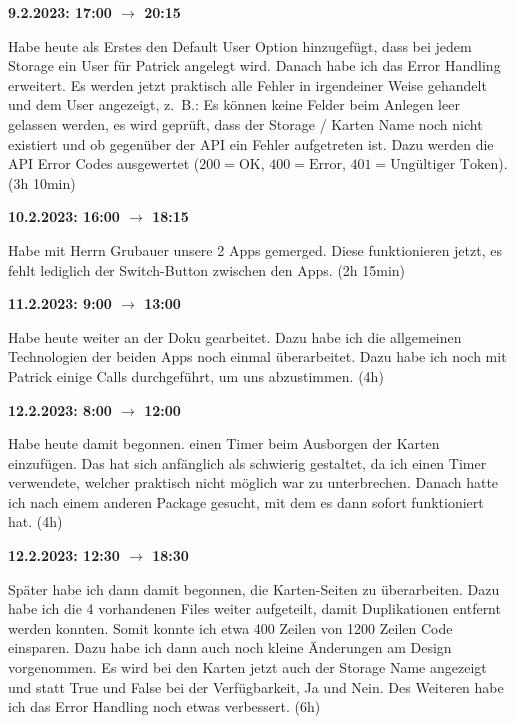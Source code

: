 \vspace{0.5cm}

\textbf{9.2.2023: 17:00 $\rightarrow$ 20:15}

Habe heute als Erstes den Default User Option hinzugefügt, dass bei jedem Storage ein User für Patrick angelegt wird. Danach habe ich das Error Handling erweitert. Es werden jetzt praktisch alle Fehler in irgendeiner Weise gehandelt und dem User angezeigt, z. B.: Es können keine Felder beim Anlegen leer gelassen werden, es wird geprüft, dass der Storage / Karten Name noch nicht existiert und ob gegenüber der API ein Fehler aufgetreten ist. Dazu werden die API Error Codes ausgewertet ($200 = \text{OK}$, $400 = \text{Error}$, $401 = \text{Ungültiger Token}$). (3h 10min)

\vspace{0.5cm}

\textbf{10.2.2023: 16:00 $\rightarrow$ 18:15}

Habe mit Herrn Grubauer unsere 2 Apps gemerged. Diese funktionieren jetzt, es fehlt lediglich der Switch-Button zwischen den Apps. (2h 15min)

\vspace{0.5cm}

\textbf{11.2.2023: 9:00 $\rightarrow$ 13:00} \

Habe heute weiter an der Doku gearbeitet. Dazu habe ich die allgemeinen Technologien der beiden Apps noch einmal überarbeitet. Dazu habe ich noch mit Patrick einige Calls durchgeführt, um uns abzustimmen. (4h)

\vspace{0.5cm}

\textbf{12.2.2023: 8:00 $\rightarrow$ 12:00} \

Habe heute damit begonnen. einen Timer beim Ausborgen der Karten einzufügen. Das hat sich anfänglich als schwierig gestaltet, da ich einen Timer verwendete, welcher praktisch nicht möglich war zu unterbrechen. Danach hatte ich nach einem anderen Package gesucht, mit dem es dann sofort funktioniert hat. (4h)

\vspace{0.5cm}

\textbf{12.2.2023: 12:30 $\rightarrow$ 18:30} \

Später habe ich dann damit begonnen, die Karten-Seiten zu überarbeiten. Dazu habe ich die 4 vorhandenen Files weiter aufgeteilt, damit Duplikationen entfernt werden konnten. Somit konnte ich etwa 400 Zeilen von 1200 Zeilen Code einsparen. Dazu habe ich dann auch noch kleine Änderungen am Design vorgenommen. Es wird bei den Karten jetzt auch der Storage Name angezeigt und statt True und False bei der Verfügbarkeit, Ja und Nein. Des Weiteren habe ich das Error Handling noch etwas verbessert. (6h)

